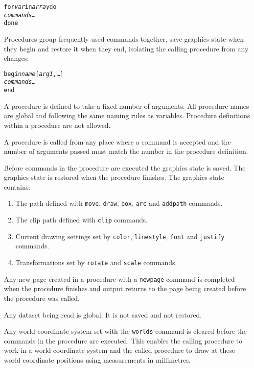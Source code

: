 \begin{alltt}
for \textit{var} in \textit{array} do
  \textit{commands} \dots
done
\end{alltt}

Procedures group frequently used commands together, save
graphics state when they begin and restore it when they end,
isolating the calling procedure from any changes:

\begin{alltt}
begin \textit{name} [\textit{arg1}, \dots]
  \textit{commands} \dots
end
\end{alltt}

A procedure is defined to take a fixed number of arguments.
All procedure names are global and following the same naming
rules as variables.
Procedure definitions within a procedure are not allowed.

A procedure is called from any place where a command is accepted
and the number of arguments passed must match the number 
in the procedure definition.

Before commands in the procedure are executed
the graphics state is saved.
\label{graphicsstate}
The graphics state is restored when the procedure finishes.
The graphics state contains:

\begin{enumerate}
\item
The path defined with
\texttt{move},
\texttt{draw},
\texttt{box},
\texttt{arc} and
\texttt{addpath}
commands.

\item
The clip path defined with
\texttt{clip} commands.

\item
Current drawing settings set by
\texttt{color},
\texttt{linestyle},
\texttt{font} and \texttt{justify}
commands.

\item
Transformations set by \texttt{rotate} and \texttt{scale} commands.
\end{enumerate}

Any new page created in a procedure with a
\texttt{newpage}
command is completed when the procedure finishes and output
returns to the page being created before the procedure was called.

Any dataset being read is global.  It is not saved and not restored.

Any world coordinate system set with the \texttt{worlds} command is cleared
before the commands in the procedure are executed.  This enables the calling
procedure to work in a world coordinate system and the called procedure to draw
at these world coordinate positions using measurements in millimetres.


